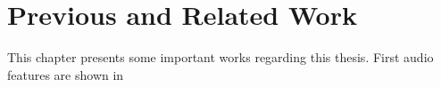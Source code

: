 
\chapter{Previous and Related Work}\label{sec:prev}
This chapter presents some important works regarding this thesis.
First audio features are shown in











